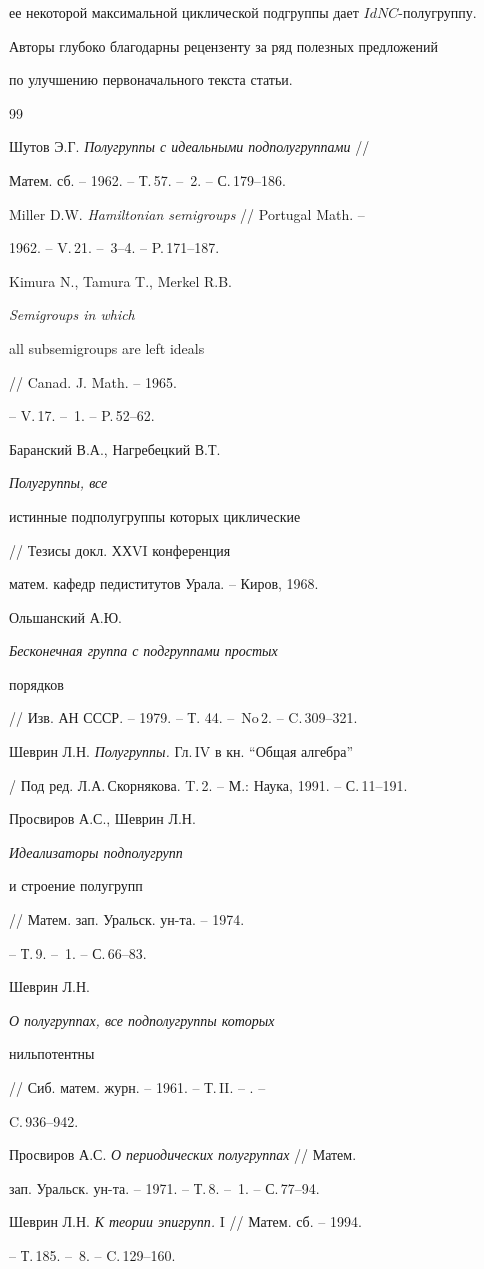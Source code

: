 ее некоторой максимальной циклической подгруппы дает $IdNC$-полугруппу.





Авторы глубоко благодарны рецензенту за ряд полезных предложений


по улучшению первоначального текста статьи.





\begin{thebibliography}{99}





 Шутов Э.Г. {\em Полугруппы с идеальными подполугруппами} //


Матем. сб. -- 1962. -- Т.\,57. -- \No\,2. -- С.\,179--186.


 Miller D.W. {\em Hamiltonian semigroups} // Portugal Math. --


1962. -- V.\,21. -- \No\,3--4. -- P.\,171--187.


 Kimura N., Tamura T., Merkel R.B. {\em Semigroups in which


all subsemigroups are left ideals} // Canad. J. Math. -- 1965.


-- V.\,17. -- \No\,1. -- P.\,52--62.


 Баранский В.А., Нагребецкий В.Т. {\em Полугруппы, все


истинные подполугруппы которых циклические} // Тезисы докл. ХХVI конференция


матем. кафедр педиститутов Урала. -- Киров, 1968.


 Ольшанский А.Ю. {\em Бесконечная группа с подгруппами простых


порядков} // Изв. АН СССР. -- 1979. -- Т. 44. --\ No\,2. -- C.\,309--321.


 Шеврин Л.Н. {\em Полугруппы.} Гл.\,IV в кн. ``Общая алгебра''


/ Под ред. Л.А.\,Скорнякова. T.\,2. -- М.: Наука, 1991. -- С.\,11--191.


 Просвиров А.С., Шеврин Л.Н. {\em Идеализаторы подполугрупп


и строение полугрупп } // Матем. зап. Уральск. ун-та. -- 1974.


-- Т.\,9. -- \No\,1. -- С.\,66--83.


 Шеврин Л.Н. {\em О полугруппах, все подполугруппы которых


нильпотентны} // Сиб. матем. журн. -- 1961. -- Т.\,II. -- . --


C.\,936--942.


 Просвиров А.С. {\em О периодических полугруппах} // Матем.


зап. Уральск. ун-та. -- 1971. -- Т.\,8. -- \No\,1. -- С.\,77--94.


 Шеврин Л.Н. {\em К теории эпигрупп. } I // Матем. сб. -- 1994.


-- Т.\,185. -- \No\,8. -- C.\,129--160.


\end{thebibliography}





